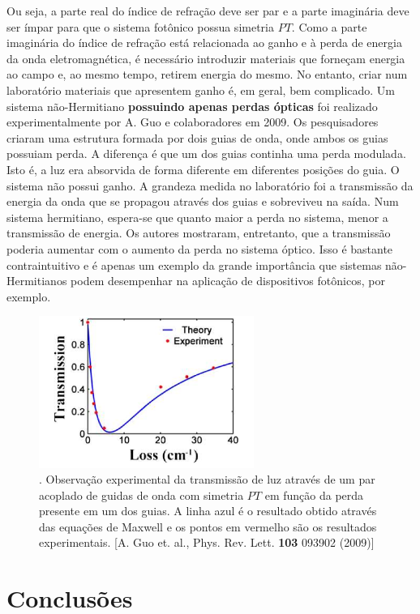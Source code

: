\documentclass{article}
\begin{document}
Ou seja, a parte real do índice de refração deve ser par e a parte imaginária deve ser ímpar para que o sistema fotônico possua simetria $PT$. Como a parte imaginária do índice de refração está relacionada ao ganho e à perda de energia da onda eletromagnética, é necessário introduzir materiais que forneçam energia ao campo e, ao mesmo tempo, retirem energia do mesmo. No entanto, criar num laboratório materiais que apresentem ganho é, em geral, bem complicado. Um sistema não-Hermitiano \textbf{possuindo apenas perdas ópticas} foi realizado experimentalmente por A. Guo e colaboradores em 2009. Os pesquisadores criaram uma estrutura formada por dois guias de onda, onde ambos os guias possuiam perda. A diferença é que um dos guias continha uma perda modulada. Isto é, a luz era absorvida de forma diferente em diferentes posições do guia. O sistema não possui ganho. A grandeza medida no laboratório foi a transmissão da energia da onda que se propagou através dos guias e sobreviveu na saída. Num sistema hermitiano, espera-se que quanto maior a perda no sistema, menor a transmissão de energia. Os autores mostraram, entretanto, que a transmissão poderia aumentar com o aumento da perda no sistema óptico. Isso é bastante contraintuitivo e é apenas um exemplo da grande importância que sistemas não-Hermitianos podem desempenhar na aplicação de dispositivos fotônicos, por exemplo.


\begin{figure}[h]
\centering
\includegraphics[width=7cm]{fig4.pdf}
\captionsetup{labelsep=none}
\caption{. Observação experimental da transmissão de luz através de um par acoplado de guidas de onda com simetria $PT$ em função da perda presente em um dos guias. A linha azul é o resultado obtido através das equações de Maxwell e os pontos em vermelho são os resultados experimentais. [A. Guo et. al., Phys. Rev. Lett. \textbf{103} 093902 (2009)] }
\end{figure}



\section{Conclusões}
\end{document}
